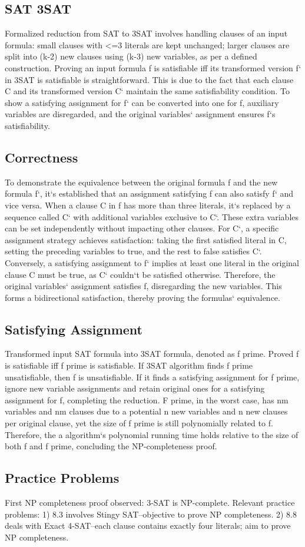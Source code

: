 \subsection*{SAT 3SAT}
Formalized reduction from SAT to 3SAT involves handling clauses of an input formula: small clauses with \textless{}=3 literals are kept unchanged; larger clauses are split into (k-2) new clauses using (k-3) new variables, as per a defined construction.
Proving an input formula f is satisfiable iff its transformed version f` in 3SAT is satisfiable is straightforward.
This is due to the fact that each clause C and its transformed version C` maintain the same satisfiability condition.
To show a satisfying assignment for f` can be converted into one for f, auxiliary variables are disregarded, and the original variables` assignment ensures f`s satisfiability.

\subsection*{Correctness}
To demonstrate the equivalence between the original formula f and the new formula f`, it`s established that an assignment satisfying f can also satisfy f` and vice versa.
When a clause C in f has more than three literals, it`s replaced by a sequence called C` with additional variables exclusive to C`.
These extra variables can be set independently without impacting other clauses.
For C`, a specific assignment strategy achieves satisfaction: taking the first satisfied literal in C, setting the preceding variables to true, and the rest to false satisfies C`.
Conversely, a satisfying assignment to f` implies at least one literal in the original clause C must be true, as C` couldn`t be satisfied otherwise.
Therefore, the original variables` assignment satisfies f, disregarding the new variables.
This forms a bidirectional satisfaction, thereby proving the formulas` equivalence.

\subsection*{Satisfying Assignment}
Transformed input SAT formula into 3SAT formula, denoted as f prime.
Proved f is satisfiable iff f prime is satisfiable.
If 3SAT algorithm finds f prime unsatisfiable, then f is unsatisfiable.
If it finds a satisfying assignment for f prime, ignore new variable assignments and retain original ones for a satisfying assignment for f, completing the reduction.
F prime, in the worst case, has nm variables and nm clauses due to a potential n new variables and n new clauses per original clause, yet the size of f prime is still polynomially related to f.
Therefore, the a algorithm`s polynomial running time holds relative to the size of both f and f prime, concluding the NP-completeness proof.

\subsection*{Practice Problems}
First NP completeness proof observed: 3-SAT is NP-complete.
Relevant practice problems:
1) 8.3 involves Stingy SAT--objective to prove NP completeness.
2) 8.8 deals with Exact 4-SAT--each clause contains exactly four literals; aim to prove NP completeness.

